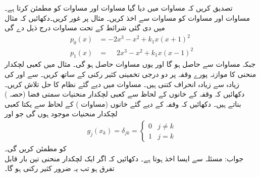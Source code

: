 
\quad
تصدیق کریں کہ مساوات  میں دیا گیا  مساوات  اور مساوات  کو مطمئن کرتا ہے۔
\quad
مساوات  اور مساوات  کو مساوات  سے اخذ کریں۔
\quad
مثال  پر غور کریں۔دکھائیں کہ مثال میں دی گئی شرائط کے تحت مساوات  درج ذیل دے گی
\begin{align*}
p_0(x)&=-2x^3-x^2+k_1x(x+1)^2\\
p_1(x)&=\phantom{-}2x^3-x^2+k_1x(x-1)^2
\end{align*}
جبکہ مساوات  سے  حاصل ہو گا اور یوں مساوات  حاصل ہو گی۔
\quad
مثال  میں کعبی لچکدار منحنی کا موازنہ پورے وقفہ پر دو درجی تخمینی کثیر رکنی  کے ساتھ کریں۔  سے  اور  کی زیادہ سے زیادہ انحراف کتنی ہیں۔
\quad
مساوات  میں دیے گئے نظام کا حل تلاش کریں۔
\quad
دکھائیں کہ وقفہ کے خانوں کے لحاظ سے کعبی لچکدار منحنیات سمتی فضا (حصہ ) بناتے ہیں۔
\quad
دکھائیں کہ وقفہ کے  دیے گئے خانوں  (مساوات ) کے لحاظ سے   یکتا کعبی لچکدار منحنیات  موجود ہوں گی جو  اور
\begin{align*}
g_j(x_k)=\delta_{jk}=
\begin{cases}
0& j\ne k\\
1&j=k
\end{cases}
\end{align*}
کو مطمئن کریں گی۔\\
جواب:\quad 
مسئلہ  سے ایسا اخذ ہوتا ہے۔
\quad
دکھائیں کہ اگر ایک لچکدار منحنی تین بار قابل تفرق ہو تب یہ ضرور کثیر رکنی ہو گا۔
\quad
